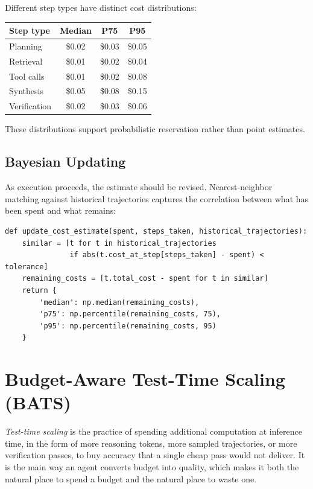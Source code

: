 \documentclass[11pt]{book}
\begin{document}
Different step types have distinct cost distributions:

\begin{center}
\begin{tabular}{lccc}
\toprule
Step type & Median & P75 & P95 \\
\midrule
Planning & \$0.02 & \$0.03 & \$0.05 \\
Retrieval & \$0.01 & \$0.02 & \$0.04 \\
Tool calls & \$0.01 & \$0.02 & \$0.08 \\
Synthesis & \$0.05 & \$0.08 & \$0.15 \\
Verification & \$0.02 & \$0.03 & \$0.06 \\
\bottomrule
\end{tabular}
\end{center}

These distributions support probabilistic reservation rather than point estimates.

\subsection{Bayesian Updating}

As execution proceeds, the estimate should be revised. Nearest-neighbor matching against historical trajectories captures the correlation between what has been spent and what remains:
{\footnotesize
\begin{verbatim}
def update_cost_estimate(spent, steps_taken, historical_trajectories):
    similar = [t for t in historical_trajectories
               if abs(t.cost_at_step[steps_taken] - spent) < tolerance]
    remaining_costs = [t.total_cost - spent for t in similar]
    return {
        'median': np.median(remaining_costs),
        'p75': np.percentile(remaining_costs, 75),
        'p95': np.percentile(remaining_costs, 95)
    }
\end{verbatim}
}

\section{Budget-Aware Test-Time Scaling (BATS)}

\emph{Test-time scaling} is the practice of spending additional computation at inference time, in the form of more reasoning tokens, more sampled trajectories, or more verification passes, to buy accuracy that a single cheap pass would not deliver. It is the main way an agent converts budget into quality, which makes it both the natural place to spend a budget and the natural place to waste one.
\end{document}
